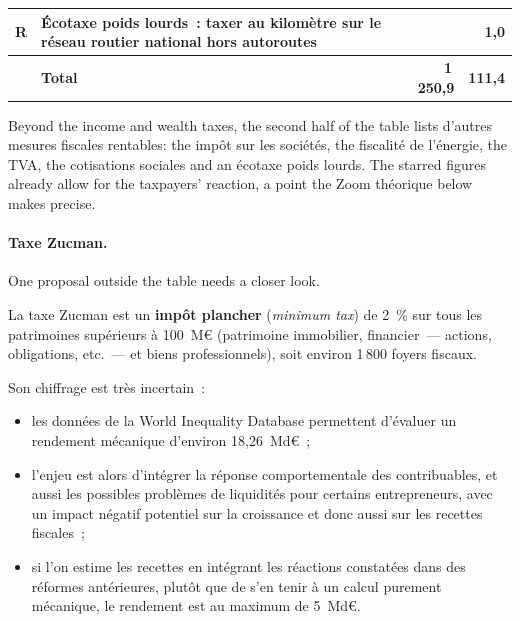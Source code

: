 \begin{center}
\begin{minipage}{\textwidth}
\begin{tabularx}{\textwidth}{@{}l>{\raggedright\arraybackslash}Xrr@{}}
    R & Écotaxe poids lourds~: taxer au kilomètre sur le réseau routier national hors autoroutes & & 1,0 \\
    \midrule
    & \textbf{Total} & \textbf{1\,250,9} & \textbf{111,4} \\
    \bottomrule
  \end{tabularx}
\end{minipage}
\end{center}

Beyond the income and wealth taxes, the second half of the table lists
d'autres mesures fiscales rentables: the impôt sur les sociétés, the fiscalité de
l'énergie, the TVA, the cotisations sociales and an écotaxe poids lourds. The
starred figures already allow for the taxpayers' reaction, a point the Zoom
théorique below makes precise.

\paragraph{Taxe Zucman.}
One proposal outside the table needs a closer look.

\begin{definition}
  La taxe Zucman est un \textbf{impôt plancher} (\textit{minimum tax}) de 2~\%
  sur tous les patrimoines supérieurs à 100~M€ (patrimoine immobilier,
  financier~--- actions, obligations, etc.~--- et biens professionnels),
  soit environ 1\,800 foyers fiscaux.
\end{definition}

Son chiffrage est très incertain~:
\begin{itemize}
  \item les données de la World Inequality Database permettent d'évaluer un
    rendement mécanique d'environ 18,26~Md€~;
  \item l'enjeu est alors d'intégrer la réponse comportementale des
    contribuables, et aussi les possibles problèmes de liquidités pour certains
    entrepreneurs, avec un impact négatif potentiel sur la croissance et donc
    aussi sur les recettes fiscales~;
  \item si l'on estime les recettes en intégrant les réactions constatées dans
    des réformes antérieures, plutôt que de s'en tenir à un calcul purement
    mécanique, le rendement est au maximum de 5~Md€.
\end{itemize}

